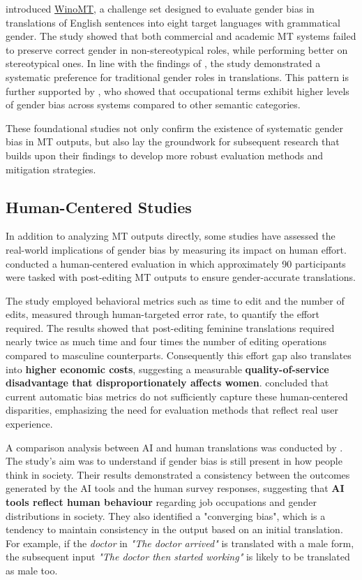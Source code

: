 \textbf{\citet{stanovskyEvaluatingGenderBias2019}} introduced \href{https://github.com/gabrielStanovsky/mt_gender}{WinoMT}, a challenge set designed to evaluate gender bias in translations of English sentences into eight target languages with grammatical gender. The study showed that both commercial and academic MT systems failed to preserve correct gender in non-stereotypical roles, while performing better on stereotypical ones. In line with the findings of \citeauthor{pratesAssessingGenderBias2019}, the study demonstrated a systematic preference for traditional gender roles in translations. This pattern is further supported by \textbf{\citet{choMeasuringGenderBias2019}}, who showed that occupational terms exhibit higher levels of gender bias across systems compared to other semantic categories. 

These foundational studies not only confirm the existence of systematic gender bias in MT outputs, but also lay the groundwork for subsequent research that builds upon their findings to develop more robust evaluation methods and mitigation strategies.

\subsection{Human-Centered Studies}
In addition to analyzing MT outputs directly, some studies have assessed the real-world implications of gender bias by measuring its impact on human effort. \citet{savoldiWhatHarmQuantifying2024} conducted a human-centered evaluation in which approximately 90 participants were tasked with post-editing MT outputs to ensure gender-accurate translations.

The study employed behavioral metrics such as time to edit and the number of edits, measured through human-targeted error rate, to quantify the effort required. The results showed that post-editing feminine translations required nearly twice as much time and four times the number of editing operations compared to masculine counterparts. Consequently this effort gap also translates into \textbf{higher economic costs}, suggesting a measurable \textbf{quality-of-service disadvantage that disproportionately affects women}. \citeauthor{savoldiWhatHarmQuantifying2024} concluded that current automatic bias metrics do not sufficiently capture these human-centered disparities, emphasizing the need for evaluation methods that reflect real user experience.

A comparison analysis between AI and human translations was conducted by \citet{smacchiaDoesAIReflect2024}. The study's aim was to understand if gender bias is still present in how people think in society. Their results demonstrated a consistency between the outcomes generated by the AI tools and the human survey responses, suggesting that \textbf{AI tools reflect human behaviour} regarding job occupations and gender distributions in society. They also identified a "converging bias", which is a tendency to maintain consistency in the output based on an initial translation. For example, if the \textit{doctor} in \textit{"The doctor arrived"} is translated with a male form, the subsequent input \textit{"The doctor then started working"} is likely to be translated as male too.


